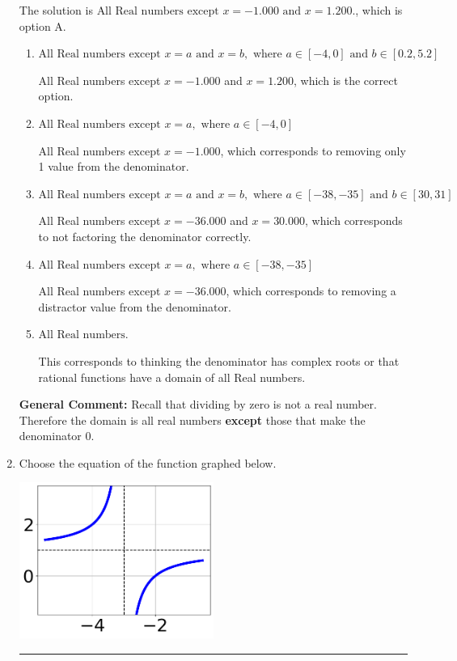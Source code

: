 \documentclass{extbook}[14pt]
\newcommand{\litem}[1]{\item #1

\rule{\textwidth}{0.4pt}}
\begin{document}
\begin{enumerate}
{The solution is \( \text{All Real numbers except } x = -1.000 \text{ and } x = 1.200. \), which is option A.\begin{enumerate}[label=\Alph*.]
\item \( \text{All Real numbers except } x = a \text{ and } x = b, \text{ where } a \in [-4, 0] \text{ and } b \in [0.2, 5.2] \)

All Real numbers except $x = -1.000$ and $x = 1.200$, which is the correct option.
\item \( \text{All Real numbers except } x = a, \text{ where } a \in [-4, 0] \)

All Real numbers except $x = -1.000$, which corresponds to removing only 1 value from the denominator.
\item \( \text{All Real numbers except } x = a \text{ and } x = b, \text{ where } a \in [-38, -35] \text{ and } b \in [30, 31] \)

All Real numbers except $x = -36.000$ and $x = 30.000$, which corresponds to not factoring the denominator correctly.
\item \( \text{All Real numbers except } x = a, \text{ where } a \in [-38, -35] \)

All Real numbers except $x = -36.000$, which corresponds to removing a distractor value from the denominator.
\item \( \text{All Real numbers.} \)

This corresponds to thinking the denominator has complex roots or that rational functions have a domain of all Real numbers.
\end{enumerate}

\textbf{General Comment:} Recall that dividing by zero is not a real number. Therefore the domain is all real numbers \textbf{except} those that make the denominator 0.
}
\litem{
Choose the equation of the function graphed below.

\begin{center}
    \includegraphics[width=0.5\textwidth]{../Figures/rationalGraphToEquationB.png}
\end{center}




}
\end{enumerate}
\end{document}
